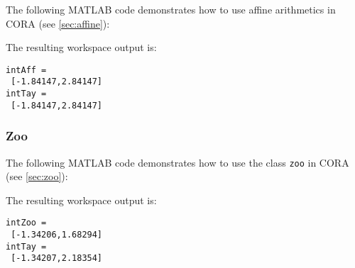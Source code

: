 The following MATLAB code demonstrates how to use affine arithmetics in CORA (see \cref{sec:affine}):

{\small
}

The resulting workspace output is:
\begin{Verbatim}
intAff = 
 [-1.84147,2.84147]
intTay = 
 [-1.84147,2.84147]
\end{Verbatim}








\subsubsection{Zoo}		\label{sec:zooExample}

The following MATLAB code demonstrates how to use the class \texttt{zoo} in CORA (see \cref{sec:zoo}):

{\small
}

The resulting workspace output is:
\begin{Verbatim}
intZoo = 
 [-1.34206,1.68294]
intTay = 
 [-1.34207,2.18354]
\end{Verbatim}






